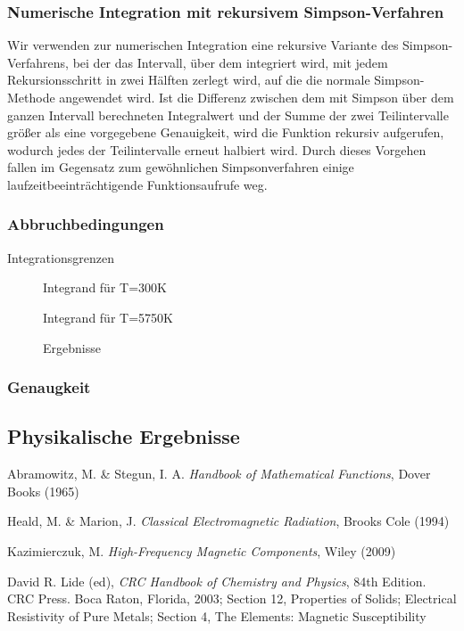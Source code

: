 \documentclass[10pt,a4paper]{article}
\begin{document}
\subsubsection{Numerische Integration mit rekursivem Simpson-Verfahren}

Wir verwenden zur numerischen Integration eine rekursive Variante des Simpson-Verfahrens, bei der das Intervall, über dem integriert wird, mit jedem Rekursionsschritt in zwei Hälften zerlegt wird, auf die die normale Simpson-Methode angewendet wird. Ist die Differenz zwischen dem mit Simpson über dem ganzen Intervall berechneten Integralwert und der Summe der zwei Teilintervalle größer als eine vorgegebene Genauigkeit, wird die Funktion rekursiv aufgerufen, wodurch jedes der Teilintervalle erneut halbiert wird. Durch dieses Vorgehen fallen im Gegensatz zum gewöhnlichen Simpsonverfahren einige laufzeitbeeinträchtigende Funktionsaufrufe weg.

\subsubsection{Abbruchbedingungen}

Integrationsgrenzen
\begin{figure}[htbp]
\centering

\caption{Integrand für T=300K}
\end{figure}

\begin{figure}[htbp]
\centering

\caption{Integrand für T=5750K}


\caption{Ergebnisse}
\end{figure}

\subsubsection{Genaugkeit}

\subsection{Physikalische Ergebnisse}
\label{ssec:physikalischeergebnisse}

\begin{thebibliography}{9}

Abramowitz, M. \& Stegun, I. A.
\emph{Handbook of Mathematical Functions},
Dover Books (1965)

Heald, M. \& Marion, J.
\emph{Classical Electromagnetic Radiation},
Brooks Cole (1994)

Kazimierczuk, M.
\emph{High-Frequency Magnetic Components},
Wiley (2009)

David R. Lide (ed),
\emph{CRC Handbook of Chemistry and Physics},
84th Edition. CRC Press. Boca Raton, Florida, 2003;
Section 12, Properties of Solids; Electrical Resistivity of Pure Metals;
Section 4, The Elements: Magnetic Susceptibility

\end{thebibliography}
\end{document}
